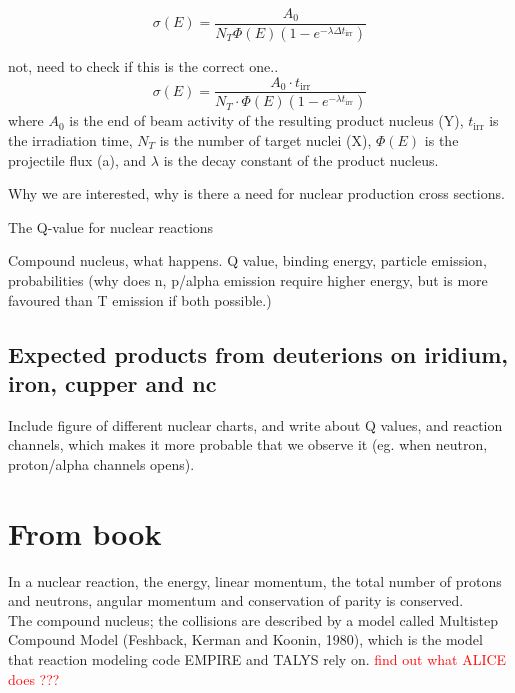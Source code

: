 \documentclass[a4paper,11pt,twoside]{book}
\begin{document}
\begin{equation} \label{eq:cross_section_equation}
    \sigma(E)=\frac{A_0}{N_T\Phi(E)(1-e^{-\lambda \Delta t_\text{irr}})}
\end{equation}

not, need to check if this is the correct one.. 
\begin{equation}
    \sigma(E) = \frac{A_0 \cdot t_\text{irr}}{N_T \cdot \Phi(E)(1-e^{-\lambda t_\text{irr}})}
\end{equation}
\noindent where $A_0$ is the end of beam activity of the resulting product nucleus (Y), $t_\text{irr}$ is the irradiation time, $N_T$ is the number of target nuclei (X), $\Phi(E)$ is the projectile flux (a), and $\lambda$ is the decay constant of the product nucleus. 

\newpage

Why we are interested, why is there a need for nuclear production cross sections. 



The Q-value for nuclear reactions 

Compound nucleus, what happens. 
Q value, binding energy, particle emission, probabilities (why does n, p/alpha emission require higher energy, but is more favoured than T emission if both possible.)


\subsection{Expected products from deuterions on iridium, iron, cupper and nc}

Include figure of different nuclear charts, and write about Q values, and reaction channels, which makes it more probable that we observe it (eg. when neutron, proton/alpha channels opens).





\section{From book}

In a nuclear reaction, the energy, linear momentum, the total number of protons and neutrons, angular momentum and conservation of parity is conserved. \\

The compound nucleus; the collisions are described by a model called Multistep Compound Model (Feshback, Kerman and Koonin, 1980), which is the model that reaction modeling code EMPIRE and TALYS rely on. \textcolor{red}{find out what ALICE does ???}
\end{document}
